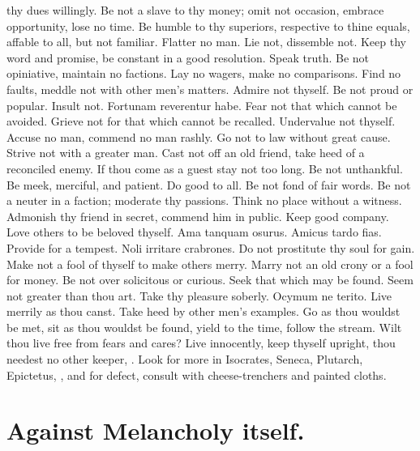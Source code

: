 {thy dues willingly. Be not a slave to thy money; omit not
occasion, embrace opportunity, lose no time. Be humble to thy
superiors, respective to thine equals, affable to all, but not
familiar. Flatter no man. Lie not, dissemble not. Keep thy word
and promise, be constant in a good resolution. Speak truth. Be not
opiniative, maintain no factions. Lay no wagers, make no comparisons.
Find no faults, meddle not with other men's matters. Admire not
thyself. Be not proud or popular. Insult not. Fortunam reverentur
habe. Fear not that which cannot be avoided.  Grieve not
for that which cannot be recalled. Undervalue not thyself.
Accuse no man, commend no man rashly. Go not to law without great
cause. Strive not with a greater man. Cast not off an old friend, take
heed of a reconciled enemy. If thou come as a guest stay not too
long. Be not unthankful. Be meek, merciful, and patient. Do good to
all. Be not fond of fair words. Be not a neuter in a faction;
moderate thy passions. Think no place without a witness. 
Admonish thy friend in secret, commend him in public. Keep good
company. Love others to be beloved thyself. Ama tanquam osurus.
Amicus tardo fias. Provide for a tempest. Noli irritare crabrones. Do
not prostitute thy soul for gain. Make not a fool of thyself to make
others merry. Marry not an old crony or a fool for money. Be not over
solicitous or curious. Seek that which may be found. Seem not greater
than thou art. Take thy pleasure soberly. Ocymum ne terito. Live
merrily as thou canst. Take heed by other men's examples. Go as
thou wouldst be met, sit as thou wouldst be found, yield to the
time, follow the stream. Wilt thou live free from fears and cares?
Live innocently, keep thyself upright, thou needest no other
keeper, \etc{}. Look for more in Isocrates, Seneca, Plutarch, Epictetus,
\etc{}, and for defect, consult with cheese-trenchers and painted cloths.


\section{Against Melancholy itself.}

}
